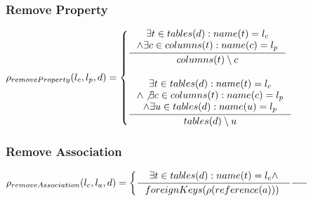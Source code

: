 \documentclass[11pt]{article}
\begin{document}
\subsubsection{Remove Property}
$
\rho_{removeProperty}(l_c, l_p, d) = \begin{cases}
 \inference{\exists t \in tables(d) : name(t) = l_c \\ \wedge \exists c \in columns(t) : name(c) = l_p  }{
columns(t) \setminus c
} \\ \\
  \inference{\exists t \in tables(d) : name(t) = l_c \\ \wedge \not \exists c \in columns(t) : name(c) = l_p \\ \wedge \exists u \in tables(d) : name(u) = l_p }{tables(d) \setminus u }
 \end{cases}
$

\subsubsection{Remove Association}
$
\rho_{removeAssociation}(l_c, l_a, d) = \begin{cases}
 \inference{\exists t \in tables(d) : name(t) = l_c \wedge }{foreignKeys(\rho(reference(a))) \ }
 
 \inference{}{}
 \end{cases}
$
	
\end{document}
